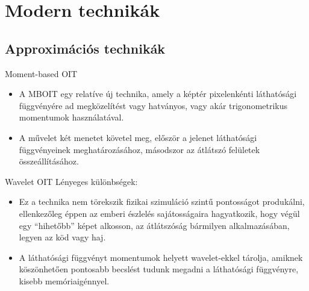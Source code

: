 \documentclass{beamer}
\begin{document}
\section{Modern technikák}
\subsection{Approximációs technikák}
\begin{frame} {Moment-based OIT}
	\begin{itemize}
	\item A MBOIT egy relatíve új technika, amely a képtér pixelenkénti láthatósági függvényére ad megközelítést vagy hatványos, vagy akár trigonometrikus momentumok használatával.
	
	\item A művelet két menetet követel meg, először a jelenet láthatósági függvényeinek meghatározásához, másodszor az átlátszó felületek összeállításához.
	\end{itemize}
\end{frame} 


\begin{frame}{Wavelet OIT}
	Lényeges különbségek:
	\begin{itemize}
		\item Ez a technika nem törekszik fizikai szimuláció szintű pontosságot produkálni, ellenkezőleg éppen az emberi észlelés sajátosságaira hagyatkozik, hogy végül egy ``hihetőbb'' képet alkosson, az átlátszóság bármilyen alkalmazásában, legyen az köd vagy haj.
		\item A láthatósági függvényt momentumok helyett wavelet-ekkel tárolja, amiknek köszönhetően pontosabb becslést tudunk megadni a láthatósági függvényre, kisebb memóriaigénnyel.
	\end{itemize}
\end{frame}
\end{document}
